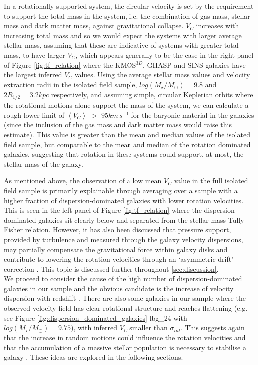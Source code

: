 \documentclass[fleqn,usenatbib]{mnras}
\begin{document}
In a rotationally supported system, the circular velocity is set by the requirement to support the total mass in the system, i.e. the combination of gas mass, stellar mass and dark matter mass, against gravitational collapse.
$V_{C}$ increases with increasing total mass and so we would expect the systems with larger average stellar mass, assuming that these are indicative of systems with greater total mass, to have larger $V_{C}$, which appears generally to be the case in the right panel of Figure \ref{fig:tf_relation} where the KMOS$^{3D}$, GHASP and SINS galaxies have the largest inferred $V_{C}$ values.
Using the average stellar mass values and velocity extraction radii in the isolated field sample, $log(M_{\star}/M_{\odot})=9.8$ and $2R_{1/2} = 3.2kpc$ respectively, and assuming simple, circular Keplerian orbits where the rotational motions alone support the mass of the system, we can calculate a rough lower limit of $\left<V_{C}\right>$ $>$ $95km\,s^{-1}$ for the baryonic material in the galaxies (since the inclusion of the gas mass and dark matter mass would raise this estimate).
This value is greater than the mean and median values of the isolated field sample, but comparable to the mean and median of the rotation dominated galaxies, suggesting that rotation in these systems could support, at most, the stellar mass of the galaxy.  

As mentioned above, the observation of a low mean $V_{C}$ value in the full isolated field sample is primarily explainable through averaging over a sample with a higher fraction of dispersion-dominated galaxies with lower rotation velocities.
This is seen in the left panel of Figure \ref{fig:tf_relation} where the dispersion-dominated galaxies sit clearly below and separated from the stellar mass Tully-Fisher relation.
However, it has also been discussed that pressure support, provided by turbulence and measured through the galaxy velocity dispersions, may partially compensate the gravitational force within galaxy disks and contribute to lowering the rotation velocities through an `asymmetric drift' correction \citep[e.g.][]{Burkert2010,Newman2013,Genzel2017}.
This topic is discussed further throughout \cref{sec:discussion}. \\


We proceed to consider the cause of the high number of dispersion-dominated galaxies in our sample and the obvious candidate is the increase of velocity dispersion with redshift \citep[e.g.][]{Genzel2006,Genzel2008,ForsterSchreiber2009,Law2009,Gnerucci2011,Epinat2012,Wisnioski2015}.
There are also some galaxies in our sample where the observed velocity field has clear rotational structure and reaches flattening (e.g. see Figure \ref{fig:dispersion_dominated_galaxies} lbg\_24 with $log(M_{\star}/M_{\odot})=9.75$), with inferred $V_{C}$ smaller than $\sigma_{int}$.
This suggests again that the increase in random motions could influence the rotation velocities and that the accumulation of a massive stellar population is necessary to stabilise a galaxy \citep[e.g.][]{Law2009,Law2012b,Law2012c,Newman2013,Wisnioski2015}.
These ideas are explored in the following sections.
\end{document}
